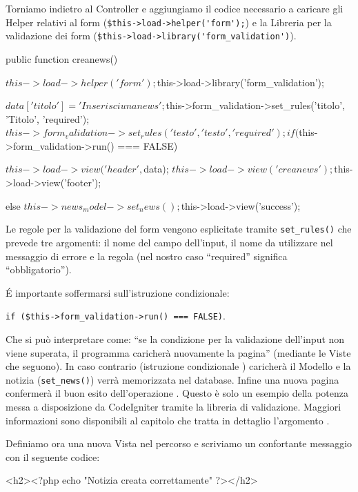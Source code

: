 Torniamo indietro al Controller  e aggiungiamo il codice necessario a caricare gli Helper relativi al form (\verb|$this->load->helper('form');|) e la Libreria per la validazione dei form (\verb|$this->load->library('form_validation')|).

\begin{code}
public function creanews()
{
	$this->load->helper('form');
	$this->load->library('form_validation');

	$data['titolo'] = 'Inserisci una news';

	$this->form_validation->set_rules('titolo', 'Titolo', 'required');
	$this->form_validation->set_rules('testo', 'testo', 'required');

	if ($this->form_validation->run() === FALSE)
	{
		$this->load->view('header', $data);
		$this->load->view('creanews');
		$this->load->view('footer');

	}
	else
	{
		$this->news_model->set_news();
		$this->load->view('success');
	}
}
\end{code}

Le regole per la validazione del form vengono esplicitate tramite \verb|set_rules()| che prevede tre argomenti: il nome del campo dell'input, il nome da utilizzare nel messaggio di errore e la regola (nel nostro caso ``required'' significa ``obbligatorio'').

\'E importante soffermarsi sull'istruzione condizionale: 

\verb|if ($this->form_validation->run() === FALSE)|. 

Che si può interpretare come: ``se la condizione per la validazione dell'input non viene superata, il programma caricherà nuovamente la pagina'' (mediante le Viste che seguono). In caso contrario (istruzione condizionale ) caricherà il Modello e la notizia (\verb|set_news()|) verrà memorizzata nel database. Infine una nuova pagina confermerà il buon esito dell'operazione . Questo è solo un esempio della potenza messa a disposizione da CodeIgniter tramite la libreria di validazione. Maggiori informazioni sono disponibili al capitolo che tratta in dettaglio l'argomento .

Definiamo ora una nuova Vista  nel percorso  e scriviamo un confortante messaggio con il seguente codice:

\begin{code}
<h2><?php echo "Notizia creata correttamente" ?></h2>
\end{code}

